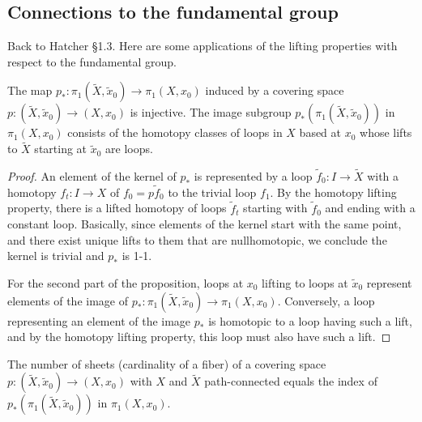 \subsection{Connections to the fundamental group}
Back to Hatcher \S 1.3.
\vspace{0.25cm}
\newline
Here are some applications of the lifting properties with respect to the fundamental group.
\begin{prop}
    The map $p_* \colon  \pi_1(\widetilde X,\widetilde x_0) \to \pi_1(X,x_0)$ induced by a covering space $p \colon (\widetilde X,\widetilde x_0) \to (X,x_0)$ is injective. The image subgroup $p_*(\pi_1(\widetilde X,\widetilde x_0))$ in $\pi_1(X,x_0)$ consists of the homotopy classes of loops in $X$ based at $x_0$ whose lifts to $\widetilde X$ starting at $\widetilde x_0$ are loops.
\end{prop}
\begin{proof}
    An element of the kernel of $p_*$ is represented by a loop $\widetilde f_0 \colon I \to \widetilde X$ with a homotopy $f_t \colon I \to X$ of $f_0=p \widetilde f_0$ to the trivial loop $f_1$. By the homotopy lifting property, there is a lifted homotopy of loops $\widetilde f_t$ starting with $\widetilde f_0$ and ending with a constant loop. Basically, since elements of the kernel start with the same point, and there exist unique lifts to them that are nullhomotopic, we conclude the kernel is trivial and $p_*$ is 1-1.

    For the second part of the proposition, loops at $x_0$ lifting to loops at $\widetilde x_0$ represent elements of the image of $p_* \colon \pi_1(\widetilde X,\widetilde x_0) \to \pi_1(X,x_0)$. Conversely, a loop representing an element of the image $p_*$ is homotopic to a loop having such a lift, and by the homotopy lifting property, this loop must also have such a lift.
\end{proof}
\begin{prop}
    The number of sheets (cardinality of a fiber) of a covering space $p \colon (\widetilde X,\widetilde x_0) \to (X,x_0)$ with $X $ and $\widetilde X$ path-connected equals the index of $p_*(\pi_1(\widetilde X,\widetilde x_0))$ in $\pi_1(X,x_0)$.    
\end{prop}
